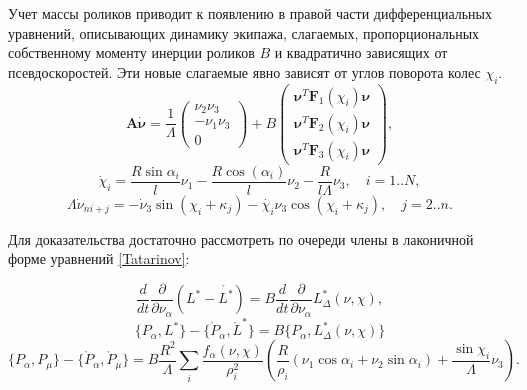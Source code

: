 \begin{stmt}
    Учет массы роликов приводит к появлению в правой части дифференциальных уравнений, описывающих динамику экипажа, слагаемых, пропорциональных собственному моменту инерции роликов $B$ и квадратично зависящих от псевдоскоростей. Эти новые слагаемые явно зависят от углов поворота колес $\chi_i$.
    $$\boldsymbol{A}\dot{\boldsymbol{\nu}} = \frac1\Lambda
    \left(
    \begin{array}{c}
         \nu_2\nu_3  \\
         -\nu_1\nu_3 \\
         0
    \end{array}
    \right) + B
     \left(
    \begin{array}{c}
         \boldsymbol{\nu}^T\boldsymbol{F}_1(\chi_i)\boldsymbol{\nu}  \\
         \boldsymbol{\nu}^T\boldsymbol{F}_2(\chi_i)\boldsymbol{\nu} \\
         \boldsymbol{\nu}^T\boldsymbol{F}_3(\chi_i)\boldsymbol{\nu}
    \end{array}
    \right),
    $$
    $$
    \dot{\chi}_i = \frac{R\sin\alpha_i}{l}\nu_1 - \frac{R\cos(\alpha_i)}{l}\nu_2 - \frac{R}{l\Lambda}\nu_3, \quad i = 1..N,
    $$
    $$
    \Lambda\dot{\nu}_{ni+j} = -\dot{\nu}_3\sin(\chi_i+\kappa_j) - \dot{\chi_i}\nu_3\cos(\chi_i+\kappa_j), \quad j = 2..n.
    $$
\end{stmt}

Для доказательства достаточно рассмотреть по очереди члены в лаконичной форме уравнений \ref{Tatarinov}:

$$ \frac{d}{dt}\frac{\partial }{\partial \nu_\alpha}(L^{*} - \mathring{L^{*}}) = B\frac{d}{dt}\frac{\partial}{\partial \nu_\alpha}L^{*}_\Delta(\nu, \chi), $$
$$ \{P_\alpha, L^{*}\} - \{\mathring{P}_\alpha, \mathring{L}^{*}\} = B\{ P_\alpha, L^{*}_\Delta(\nu, \chi) \} $$
$$\{P_\alpha, P_\mu\} - \{\mathring{P}_\alpha, \mathring{P}_\mu\} = B\frac{R^2}{\Lambda}\sum_i\frac{f_\alpha(\nu, \chi)}{\rho^2_i}(\frac{R}{\rho_i}(\nu_1\cos\alpha_i + \nu_2\sin\alpha_i) + \frac{\sin\chi_i}{\Lambda}\nu_3).$$

